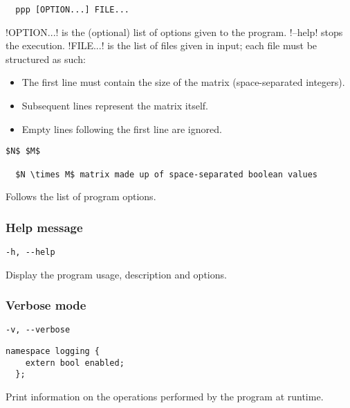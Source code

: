 \begin{lstlisting}
  ppp [OPTION...] FILE...
\end{lstlisting}

!OPTION...! is the (optional) list of options given to the program. !--help! stops the execution.
!FILE...! is the list of files given in input; each file must be structured as such:

\begin{itemize}
  \item The first line must contain the size of the matrix (space-separated integers).

  \item Subsequent lines represent the matrix itself.

  \item Empty lines following the first line are ignored.
\end{itemize}

\begin{lstlisting}[aboveskip=0pt]
  $N$ $M$

  $N \times M$ matrix made up of space-separated boolean values
\end{lstlisting}

Follows the list of program options.

\subsubsection*{Help message}

\begin{lstlisting}[aboveskip=\smallskipamount]
  -h, --help
\end{lstlisting}

Display the program usage, description and options.

\subsubsection*{Verbose mode}

\begin{lstlisting}[aboveskip=\smallskipamount]
  -v, --verbose
\end{lstlisting}

\begin{lstlisting}[style=c++_block, aboveskip=\smallskipamount]
  namespace logging {
    extern bool enabled;
  };
\end{lstlisting}

Print information on the operations performed by the program at runtime.

